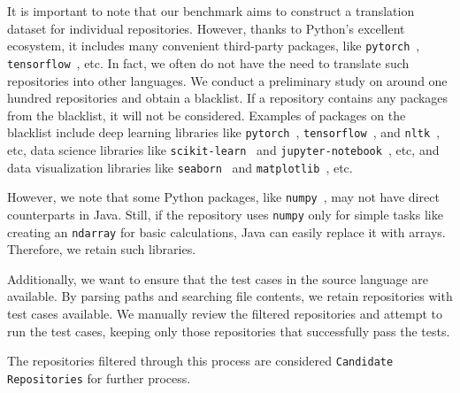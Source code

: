 It is important to note that our benchmark aims to construct a translation dataset for individual repositories. However, thanks to Python's excellent ecosystem, it includes many convenient third-party packages, like \texttt{pytorch}~\cite{pytorch}, \texttt{tensorflow}~\cite{tensorflow}, etc. In fact, we often do not have the need to translate such repositories into other languages. We conduct a preliminary study on around one hundred repositories and obtain a blacklist. If a repository contains any packages from the blacklist, it will not be considered. Examples of packages on the blacklist include deep learning libraries like \texttt{pytorch}~\cite{pytorch}, \texttt{tensorflow}~\cite{tensorflow}, and \texttt{nltk}~\cite{nltk}, etc, data science libraries like \texttt{scikit-learn}~\cite{scikit-learn} and \texttt{jupyter-notebook}~\cite{jupyter}, etc, and data visualization libraries like \texttt{seaborn}~\cite{seaborn} and \texttt{matplotlib}~\cite{matplotlib}, etc.

However, we note that some Python packages, like \texttt{numpy}~\cite{numpy}, may not have direct counterparts in Java. Still, if the repository uses \texttt{numpy} only for simple tasks like creating an \texttt{ndarray} for basic calculations, Java can easily replace it with arrays. Therefore, we retain such libraries.

Additionally, we want to ensure that the test cases in the source language are available. By parsing paths and searching file contents, we retain repositories with test cases available. We manually review the filtered repositories and attempt to run the test cases, keeping only those repositories that successfully pass the tests.

The repositories filtered through this process are considered \texttt{Candidate Repositories} for further process.


